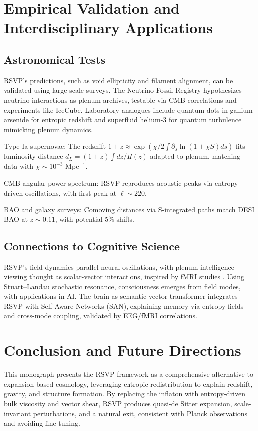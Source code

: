 \documentclass[12pt, a4paper, openany]{book}
\theoremstyle{definition}
\begin{document}
\chapter{Empirical Validation and Interdisciplinary Applications}
\section{Astronomical Tests}
RSVP's predictions, such as void ellipticity and filament alignment, can be validated using large-scale surveys. The Neutrino Fossil Registry hypothesizes neutrino interactions as plenum archives, testable via CMB correlations and experiments like IceCube. Laboratory analogues include quantum dots in gallium arsenide for entropic redshift and superfluid helium-3 for quantum turbulence mimicking plenum dynamics.

Type Ia supernovae: The redshift $1 + z \approx \exp \left( \chi / 2 \int \partial_s \ln(1 + \chi S) ds \right)$ fits luminosity distance $d_L = (1 + z) \int dz / H(z)$ adapted to plenum, matching data with $\chi \sim 10^{-3}$ Mpc$^{-1}$.

CMB angular power spectrum: RSVP reproduces acoustic peaks via entropy-driven oscillations, with first peak at $\ell \sim 220$.

BAO and galaxy surveys: Comoving distances via S-integrated paths match DESI BAO at $z \sim 0.11$, with potential 5\% shifts.

\section{Connections to Cognitive Science}
RSVP’s field dynamics parallel neural oscillations, with plenum intelligence viewing thought as scalar-vector interactions, inspired by fMRI studies \citep{Cabral:2017}. Using Stuart–Landau stochastic resonance, consciousness emerges from field modes, with applications in AI. The brain as semantic vector transformer integrates RSVP with Self-Aware Networks (SAN), explaining memory via entropy fields and cross-mode coupling, validated by EEG/fMRI correlations.

\chapter{Conclusion and Future Directions}
This monograph presents the RSVP framework as a comprehensive alternative to expansion-based cosmology, leveraging entropic redistribution to explain redshift, gravity, and structure formation. By replacing the inflaton with entropy-driven bulk viscosity and vector shear, RSVP produces quasi-de Sitter expansion, scale-invariant perturbations, and a natural exit, consistent with Planck observations and avoiding fine-tuning.
\end{document}
